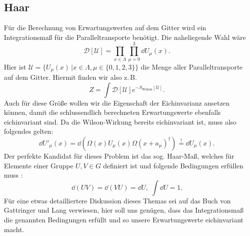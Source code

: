\subsection{Haar}
Für die Berechnung von Erwartungswerten auf dem Gitter wird ein Integrationsmaß
für die Paralleltransporte benötigt. Die naheliegende Wahl wäre \cite{gattringerLang}
\[
    \mathscr{D}[\mathcal{U}] = \prod_{x \in \Lambda} \prod_{\mu = 0}^3 \dd{U_\mu(x)}.
\]
Hier ist $\mathcal{U} = \{U_\mu(x) \, | x \in \Lambda, \mu \in \{0,1,2,3\}\}$ die
Menge aller Paralleltransporte auf dem Gitter. Hiermit finden wir also z.\,B.
\[
    Z = \int \mathscr{D}[\mathcal{U}] e^{-S_\text{Wilson}[\mathcal{U}]}.
\]
Auch für diese Größe wollen wir die Eigenschaft der Eichinvarianz ansetzen können,
damit die schlussendlich berechneten Erwartungswerte ebenfalls eichinvariant sind.
Da die Wilson-Wirkung bereits eichinvariant ist, muss also folgendes gelten:
\[
    \dd{U'_\mu(x)} = \dd{\left( \Omega(x) U_\mu(x) \Omega(x + a_\mu)^\dag \right)}
    \overset{!}{=} \dd{U_\mu(x)}.
\]
Der perfekte Kandidat für dieses Problem ist das sog. Haar-Maß, welches für Elemente
einer Gruppe $U, V \in G$ definiert ist und folgende Bedingungen erfüllen muss
\cite{gattringerLang}:
\[
    \dd{(U V)} = \dd{(V U)} = \dd{U}, \; \int \dd{U} = 1.
\]
Für eine etwas detailliertere Diskussion dieses Themas sei auf das Buch von
Gattringer und Lang \cite{gattringerLang} verwiesen, hier soll uns genügen, dass
das Integrationsmaß die genannten Bedingungen erfüllt und so unsere Erwartungswerte
eichinvariant macht.

